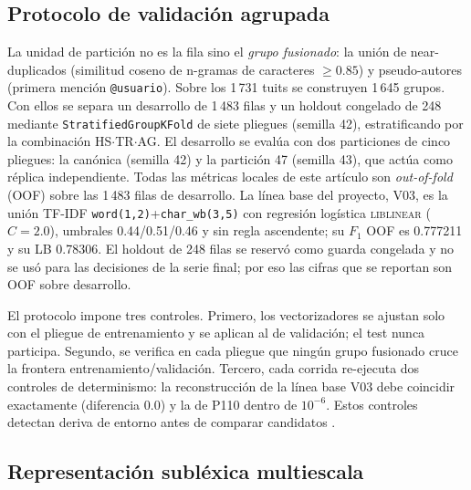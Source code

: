 \subsection{Protocolo de validación agrupada}

La unidad de partición no es la fila sino el \emph{grupo fusionado}: la unión
de near-duplicados (similitud coseno de n-gramas de caracteres $\ge 0.85$) y
pseudo-autores (primera mención \texttt{@usuario}). Sobre los 1\,731 tuits se
construyen 1\,645 grupos. Con ellos se separa un desarrollo de 1\,483 filas y
un holdout congelado de 248 mediante \texttt{StratifiedGroupKFold} de siete
pliegues (semilla 42), estratificando por la combinación HS$\cdot$TR$\cdot$AG.
El desarrollo se evalúa con dos particiones de cinco pliegues: la canónica
(semilla 42) y la partición 47 (semilla 43), que actúa como réplica
independiente. Todas las métricas locales de este artículo son
\emph{out-of-fold} (OOF) sobre las 1\,483 filas de desarrollo. La línea base
del proyecto, V03, es la unión TF-IDF \texttt{word(1,2)}+\texttt{char\_wb(3,5)}
con regresión logística \textsc{liblinear} ($C=2.0$), umbrales 0.44/0.51/0.46 y
sin regla ascendente; su $F_1$ OOF es 0.777211 y su LB 0.78306. El holdout de
248 filas se reservó como guarda congelada y no se usó para las decisiones de
la serie final; por eso las cifras que se reportan son OOF sobre desarrollo.

El protocolo impone tres controles. Primero, los vectorizadores se ajustan
solo con el pliegue de entrenamiento y se aplican al de validación; el test
nunca participa. Segundo, se verifica en cada pliegue que ningún grupo
fusionado cruce la frontera entrenamiento/validación. Tercero, cada corrida
re-ejecuta dos controles de determinismo: la reconstrucción de la línea base
V03 debe coincidir exactamente (diferencia 0.0) y la de P110 dentro de
$10^{-6}$. Estos controles detectan deriva de entorno antes de comparar
candidatos \cite{kohavi1995study,kaufman2012leakage}.

\subsection{Representación subléxica multiescala}

